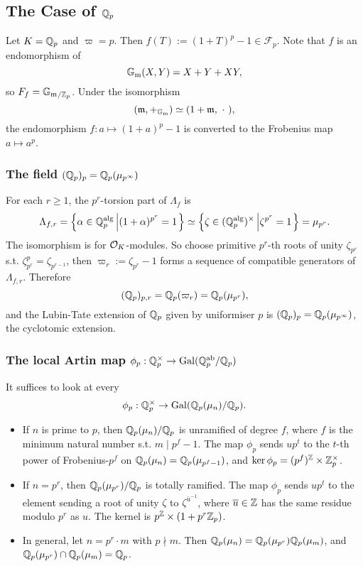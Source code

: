 \subsection{The Case of \texorpdfstring{$\mathbb{Q}_p$}{}}
Let $K = \mathbb{Q}_p$ and $\varpi = p$. Then $f(T) := (1 + T)^p - 1\in\mathcal{F}_p$.
Note that $f$ is an endomorphism of \[{\mathbb{G}_{\mathrm{m}}}(X, Y) = X + Y + XY,\] so $F_f = {\mathbb{G}_{\mathrm{m}}}{}_{/\mathbb{Z}_p}$. Under the isomorphism
\[(\mathfrak{m}, +_{{\mathbb{G}_{\mathrm{m}}}})\simeq (1 + \mathfrak{m},\ \cdot\ ),\]
the endomorphism $f : a\mapsto (1 + a)^p - 1$ is converted to the Frobenius map $a\mapsto a^p$.

\subsubsection*{The field \texorpdfstring{$(\mathbb{Q}_p)_p = \mathbb{Q}_p(\mu_{p^\infty})$}{Qpp = Qp mup infty}}

For each $r\ge 1$, the $p^r$-torsion part of $\Lambda_f$ is
\[\Lambda_{f, r} = \left\{\alpha\in\mathbb{Q}_p^{\mathrm{alg}}\left|(1 + \alpha)^{p^r} = 1\right.\right\}\simeq
\left\{\zeta\in(\mathbb{Q}_p^{\mathrm{alg}})^{\times}
\left|\zeta^{p^r} = 1\right.\right\} = \mu_{p^r}.\]
The isomorphism is for $\mathcal{O}_K$-modules.
So choose primitive $p^r$-th roots of unity $\zeta_{p^r}$ s.t. $\zeta_{p^r}^p = \zeta_{p^{r-1}}$,
then $\varpi_r := \zeta_{p^r} - 1$ forms a sequence of compatible generators of $\Lambda_{f, r}$.
Therefore \[(\mathbb{Q}_p)_{p, r} = \mathbb{Q}_p(\varpi_r) = \mathbb{Q}_p(\mu_{p^r}),\]
and the Lubin-Tate extension of $\mathbb{Q}_p$ given by uniformiser $p$ is $(\mathbb{Q}_p)_p = \mathbb{Q}_p(\mu_{p^\infty})$,
the cyclotomic extension.

\subsubsection*{The local Artin map \texorpdfstring{$\phi_p : \mathbb{Q}_p^\times\to \operatorname{Gal}(\mathbb{Q}_p^{\mathrm{ab}}/\mathbb{Q}_p)$}{}}

It suffices to look at every \[\phi_p : \mathbb{Q}_p^\times\to \operatorname{Gal}(\mathbb{Q}_p(\mu_n)/\mathbb{Q}_p).\]
\begin{itemize}
    \item If $n$ is prime to $p$, then $\mathbb{Q}_p(\mu_n)/\mathbb{Q}_p$ is unramified of degree $f$, where $f$ is the minimum natural number s.t. $m\mid p^f - 1$.
    The map $\phi_p$ sends $up^t$ to the $t$-th power of Frobenius-$p^f$ on $\mathbb{Q}_p(\mu_n) = \mathbb{Q}_p(\mu_{p^f - 1})$, and $\ker\phi_p = (p^{f})^{\mathbb{Z}}\times\mathbb{Z}_p^\times$.
    \item If $n = p^r$, then $\mathbb{Q}_p(\mu_{p^r})/\mathbb{Q}_p$ is totally ramified. The map $\phi_p$ sends $up^t$ to the element sending a root of unity $\zeta$ to $\zeta^{\bar u^{-1}}$, where $\overline u\in\mathbb{Z}$ has the same residue modulo $p^r$ as $u$.
    The kernel is $p^{\mathbb{Z}}\times (1 + p^r\mathbb{Z}_p)$.
    \item In general, let $n = p^r\cdot m$ with $p\nmid m$. Then $\mathbb{Q}_p(\mu_n) = \mathbb{Q}_p(\mu_{p^r})\mathbb{Q}_p(\mu_m)$, and $\mathbb{Q}_p(\mu_{p^r})\cap\mathbb{Q}_p(\mu_m) = \mathbb{Q}_p$.
\end{itemize}



